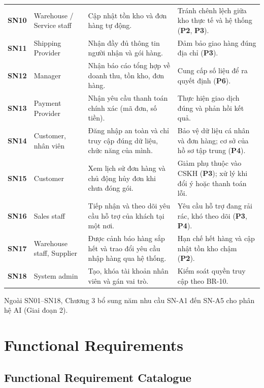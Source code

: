 \documentclass[12pt,a4paper,oneside]{report}
\begin{document}
\begin{longtable}{p{1.6cm}p{3cm}p{6cm}p{5.4cm}}
\textbf{SN10} & Warehouse / Service staff & Cập nhật tồn kho và đơn hàng tự động. & Tránh chênh lệch giữa kho thực tế và hệ thống (\textbf{P2}, \textbf{P3}). \\
\textbf{SN11} & Shipping Provider & Nhận đầy đủ thông tin người nhận và gói hàng. & Đảm bảo giao hàng đúng địa chỉ (\textbf{P3}). \\
\textbf{SN12} & Manager & Nhận báo cáo tổng hợp về doanh thu, tồn kho, đơn hàng. & Cung cấp số liệu để ra quyết định (\textbf{P6}). \\
\textbf{SN13} & Payment Provider & Nhận yêu cầu thanh toán chính xác (mã đơn, số tiền). & Thực hiện giao dịch đúng và phản hồi kết quả. \\
\textbf{SN14} & Customer, nhân viên & Đăng nhập an toàn và chỉ truy cập đúng dữ liệu, chức năng của mình. & Bảo vệ dữ liệu cá nhân và đơn hàng; cơ sở của hồ sơ tập trung (\textbf{P4}). \\
\textbf{SN15} & Customer & Xem lịch sử đơn hàng và chủ động hủy đơn khi chưa đóng gói. & Giảm phụ thuộc vào CSKH (\textbf{P3}); xử lý khi đổi ý hoặc thanh toán lỗi. \\
\textbf{SN16} & Sales staff & Tiếp nhận và theo dõi yêu cầu hỗ trợ của khách tại một nơi. & Yêu cầu hỗ trợ đang rải rác, khó theo dõi (\textbf{P3}, \textbf{P4}). \\
\textbf{SN17} & Warehouse staff, Supplier & Được cảnh báo hàng sắp hết và trao đổi yêu cầu nhập hàng qua hệ thống. & Hạn chế hết hàng và cập nhật tồn kho chậm (\textbf{P2}). \\
\textbf{SN18} & System admin & Tạo, khóa tài khoản nhân viên và gán vai trò. & Kiểm soát quyền truy cập theo BR-10. \\
\end{longtable}

Ngoài SN01--SN18, Chương 3 bổ sung năm nhu cầu SN-A1 đến SN-A5 cho phân hệ AI (Giai đoạn 2).

\section{Functional Requirements}

\subsection{Functional Requirement Catalogue}
\end{document}
